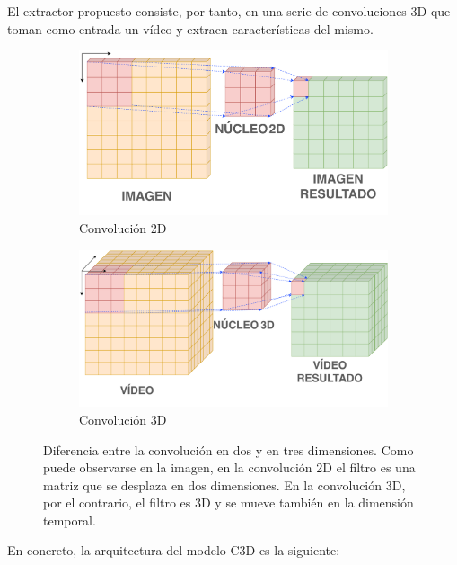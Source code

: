 \documentclass[../main.tex]{memoir}
\begin{document}
El extractor propuesto consiste, por tanto, en una serie de
convoluciones 3D que toman como entrada un vídeo y extraen
características del mismo.

\begin{figure}[H]
  \centering
  \begin{subfigure}{0.48\textwidth}
    \centering
    \includegraphics[width=.9\linewidth]{images/2d_conv.pdf}
    \caption{Convolución 2D}
  \end{subfigure}
  \begin{subfigure}{0.48\textwidth}
    \centering
    \includegraphics[width=.9\linewidth]{images/3d_conv.pdf}
    \caption{Convolución 3D}
  \end{subfigure}
  \caption{Diferencia entre la convolución en dos y en tres
    dimensiones. Como puede observarse en la imagen, en la convolución
    2D el filtro es una matriz que se desplaza en dos dimensiones. En
    la convolución 3D, por el contrario, el filtro es 3D y se mueve
    también en la dimensión temporal.}
  \label{fig:2d-3d-conv}
\end{figure}

En concreto, la arquitectura del modelo C3D es la siguiente:
\end{document}
